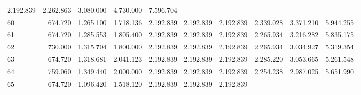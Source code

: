 \begin{tabular}{llllllllll}
  \multicolumn{1}{r}{2.192.839} &
  \multicolumn{1}{r}{2.262.863} &
  \multicolumn{1}{r}{3.080.000} &
  \multicolumn{1}{r}{4.730.000} &
  \multicolumn{1}{r}{7.596.704} \\
\multicolumn{1}{l}{\hspace{1em}60} &
  \multicolumn{1}{|r}{674.720} &
  \multicolumn{1}{r}{1.265.100} &
  \multicolumn{1}{r}{1.718.136} &
  \multicolumn{1}{r}{2.192.839} &
  \multicolumn{1}{r}{2.192.839} &
  \multicolumn{1}{r}{2.192.839} &
  \multicolumn{1}{r}{2.339.028} &
  \multicolumn{1}{r}{3.371.210} &
  \multicolumn{1}{r}{5.944.255} \\
\multicolumn{1}{l}{\hspace{1em}61} &
  \multicolumn{1}{|r}{674.720} &
  \multicolumn{1}{r}{1.285.553} &
  \multicolumn{1}{r}{1.805.400} &
  \multicolumn{1}{r}{2.192.839} &
  \multicolumn{1}{r}{2.192.839} &
  \multicolumn{1}{r}{2.192.839} &
  \multicolumn{1}{r}{2.265.934} &
  \multicolumn{1}{r}{3.216.282} &
  \multicolumn{1}{r}{5.835.175} \\
\multicolumn{1}{l}{\hspace{1em}62} &
  \multicolumn{1}{|r}{730.000} &
  \multicolumn{1}{r}{1.315.704} &
  \multicolumn{1}{r}{1.800.000} &
  \multicolumn{1}{r}{2.192.839} &
  \multicolumn{1}{r}{2.192.839} &
  \multicolumn{1}{r}{2.192.839} &
  \multicolumn{1}{r}{2.265.934} &
  \multicolumn{1}{r}{3.034.927} &
  \multicolumn{1}{r}{5.319.354} \\
\multicolumn{1}{l}{\hspace{1em}63} &
  \multicolumn{1}{|r}{674.720} &
  \multicolumn{1}{r}{1.318.681} &
  \multicolumn{1}{r}{2.041.123} &
  \multicolumn{1}{r}{2.192.839} &
  \multicolumn{1}{r}{2.192.839} &
  \multicolumn{1}{r}{2.192.839} &
  \multicolumn{1}{r}{2.285.220} &
  \multicolumn{1}{r}{3.053.665} &
  \multicolumn{1}{r}{5.261.548} \\
\multicolumn{1}{l}{\hspace{1em}64} &
  \multicolumn{1}{|r}{759.060} &
  \multicolumn{1}{r}{1.349.440} &
  \multicolumn{1}{r}{2.000.000} &
  \multicolumn{1}{r}{2.192.839} &
  \multicolumn{1}{r}{2.192.839} &
  \multicolumn{1}{r}{2.192.839} &
  \multicolumn{1}{r}{2.254.238} &
  \multicolumn{1}{r}{2.987.025} &
  \multicolumn{1}{r}{5.651.990} \\
\multicolumn{1}{l}{\hspace{1em}65} &
  \multicolumn{1}{|r}{674.720} &
  \multicolumn{1}{r}{1.096.420} &
  \multicolumn{1}{r}{1.518.120} &
  \multicolumn{1}{r}{2.192.839} &
  \multicolumn{1}{r}{2.192.839} &
  \multicolumn{1}{r}{2.192.839} &

\end{tabular}
